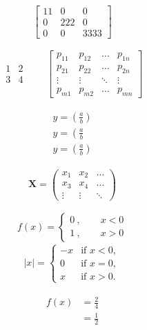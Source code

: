 \documentclass[12pt]{ctexart} %
\begin{document}
\begin{align}
    \left[
    \begin{array}{lcr} %
        11&0&0 \\
        0&222&0 \\
        0&0&3333
    \end{array}
    \right]
\end{align}

\[
\begin{matrix}
1 & 2 \\
3 & 4
\end{matrix} \qquad
\begin{bmatrix}
p_{11} & p_{12} & \ldots & p_{1n} \\
p_{21} & p_{22} & \ldots & p_{2n} \\
\vdots & \vdots & \ddots & \vdots \\
p_{m1} & p_{m2} & \ldots & p_{mn}
\end{bmatrix}
\]

\begin{align}%
    \begin{aligned}
        y = \left( \frac{a}{b} \right) \\
        y = \left( \frac{a}{b} \right. \\
        y = (\frac{a}{b})
    \end{aligned}
\end{align}

\[
\mathbf{X} = \left(
\begin{array}{ccc}
x_1 & x_2 & \ldots \\
x_3 & x_4 & \ldots \\
\vdots & \vdots & \ddots
\end{array} \right)
\]

\begin{align}%
    f(x) =\left\{
        \begin{aligned}
        0~, \qquad x<0 \\ %
        1~, \qquad x>0
        \end{aligned} 
        \right.
\end{align}
\[
|x| = \left\{
\begin{array}{rl}
-x & \text{if } x < 0,\\
0 & \text{if } x = 0,\\
x & \text{if } x > 0.
\end{array} \right.
\]

\begin{align}%
    \begin{aligned}
        f(x) &= \frac{2}{4} \\
        & = \frac{1}{2}
    \end{aligned} 
\end{align}
\end{document}
